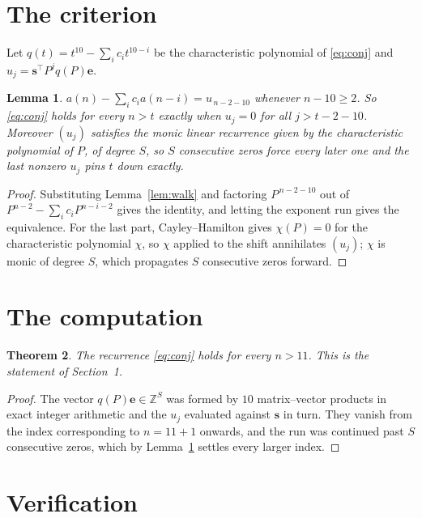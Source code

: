 \documentclass[11pt,a4paper]{article}
\theoremstyle{plain}
\newtheorem{theorem}{Theorem}
\newtheorem{lemma}[theorem]{Lemma}
\theoremstyle{definition}
\begin{document}
\section{The criterion}

Let $q(t)=t^{10}-\sum_i c_i t^{10-i}$ be the characteristic polynomial of
\eqref{eq:conj} and $u_j=\mathbf{s}^{\!\top}P^{j}q(P)\mathbf{e}$.

\begin{lemma}\label{lem:crit}
$a(n)-\sum_i c_i a(n-i)=u_{\,n-2-10}$ whenever $n-10\ge2$. So \eqref{eq:conj}
holds for every $n>t$ exactly when $u_j=0$ for all $j>t-2-10$. Moreover $(u_j)$
satisfies the monic linear recurrence given by the characteristic polynomial of $P$, of
degree $S$, so $S$ consecutive zeros force every later one and the last nonzero $u_j$ pins
$t$ down exactly.
\end{lemma}

\begin{proof}
Substituting Lemma~\ref{lem:walk} and factoring $P^{\,n-2-10}$ out of
$P^{n-2}-\sum_i c_i P^{n-i-2}$ gives the identity, and letting the exponent run gives the
equivalence. For the last part, Cayley--Hamilton gives $\chi(P)=0$ for the characteristic
polynomial $\chi$, so $\chi$ applied to the shift annihilates $(u_j)$; $\chi$ is monic of
degree $S$, which propagates $S$ consecutive zeros forward.
\end{proof}

\section{The computation}

\begin{theorem}
The recurrence \eqref{eq:conj} holds for every $n>11$. This is the statement of
Section~1.
\end{theorem}

\begin{proof}
The vector $q(P)\mathbf{e}\in\mathbb{Z}^{S}$ was formed by $10$ matrix--vector
products in exact integer arithmetic and the $u_j$ evaluated against $\mathbf{s}$ in turn.
They vanish from the index corresponding to $n=11+1$ onwards, and the run was continued
past $S$ consecutive zeros, which by Lemma~\ref{lem:crit} settles every larger index.
\end{proof}

\section{Verification}
\end{document}
